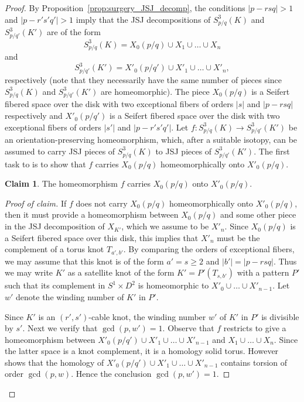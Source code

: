 \documentclass{amsart} %
\theoremstyle{thm}
\theoremstyle{definition}
\newtheorem*{claim}{Claim}
\numberwithin{equation}{section}
\begin{document}
\begin{proof}
By Proposition~\ref{prop:surgery_JSJ_decomp}, the conditions $|p-rsq|>1$ and $|p-r's'q'|>1$ imply that the JSJ decompositions of $S_{p/q}^3(K)$ and $S_{p/q'}^3(K')$ are of the form
\[
S_{p/q}^3(K)=X_0(p/q) \cup X_1 \cup \dots \cup X_n
\]
and
 \[
S_{p/q'}^3(K')=X'_0(p/q') \cup X'_1 \cup \dots \cup X'_{n},
\]
respectively (note that they necessarily have the same number of pieces since $S_{p/q}^3(K)$ and $S_{p/q'}^3(K')$ are homeomorphic). The piece $X_0(p/q)$ is a Seifert fibered space over the disk with two exceptional fibers of orders $|s|$ and $|p-rsq|$ respectively and $X'_0(p/q')$ is a Seifert fibered space over the disk with two exceptional fibers of orders $|s'|$ and $|p-r's'q'|$.
Let $f\colon S_{p/q}^3(K) \rightarrow S_{p/q'}^3(K')$ be an orientation-preserving homeomorphism, which, after a suitable isotopy, can be assumed to carry JSJ pieces of $S_{p/q}^3(K)$ to JSJ pieces of $S_{p/q'}^3(K')$. The first task to is to show that $f$ carries $X_0(p/q)$ homeomorphically onto $X'_0(p/q)$.
\begin{claim}
    The homeomorphism $f$ carries $X_0(p/q)$ onto $X'_0(p/q)$.
\end{claim}
\begin{proof}[Proof of claim]
    If $f$ does not carry $X_0(p/q)$ homeomorphically onto $X'_0(p/q)$, then it must provide a homeomorphism between $X_0(p/q)$ and some other piece in the JSJ decomposition of $X_{K'}$, which we assume to be $X'_n$. Since $X_0(p/q)$ is a Seifert fibered space over this disk, this implies that $X'_n$ must be the complement of a torus knot $T_{a',b'}$. By comparing the orders of exceptional fibers, we may assume that this knot is of the form $a'=s\geq 2$ and $|b'|=|p-rsq|$. Thus we may write $K'$ as a satellite knot of the form $K'=P'(T_{s, b'})$ with a pattern $P'$ such that its complement in $S^1\times D^2$ is homeomorphic to $X'_0 \cup \dots \cup X'_{n-1}$. Let $w'$ denote the winding number of $K'$ in $P'$. 
    
    Since $K'$ is an $(r',s')$-cable knot, the winding number $w'$ of $K'$ in $P'$ is divisible by $s'$. Next we verify that $\gcd(p,w')=1$. Observe that $f$ restricts to give a homeomorphism between $X'_0(p/q') \cup X'_1 \cup \dots \cup X'_{n-1}$ and $X_1 \cup \dots \cup X_n$. Since the latter space is a knot complement, it is a homology solid torus. However \cite[Lemma~3.3(i)]{Gordon1983Satellite} shows that the homology of $X'_0(p/q') \cup X'_1 \cup \dots \cup X'_{n-1}$ contains torsion of order $\gcd(p,w)$. Hence the conclusion $\gcd(p,w')=1$.
    

\end{proof}
\end{proof}
\end{document}
